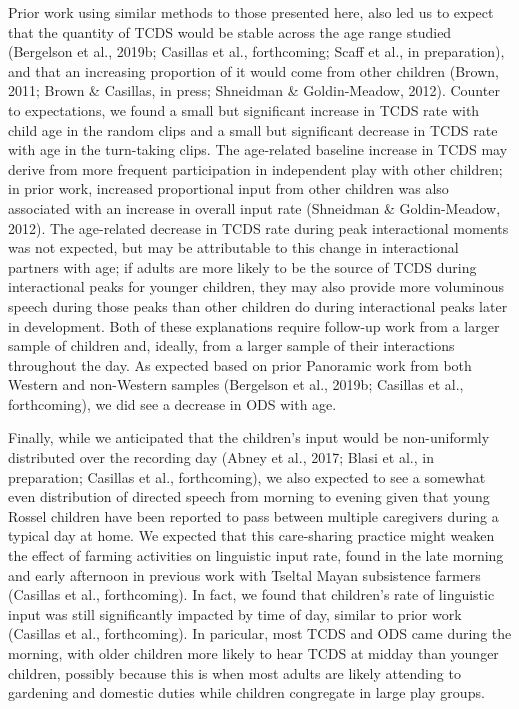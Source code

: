 \documentclass[,man,floatsintext]{apa6}
\begin{document}
Prior work using similar methods to those presented here, also led us to
expect that the quantity of TCDS would be stable across the age range
studied (Bergelson et al., 2019b; Casillas et al., forthcoming; Scaff et
al., in preparation), and that an increasing proportion of it would come
from other children (Brown, 2011; Brown \& Casillas, in press; Shneidman
\& Goldin-Meadow, 2012). Counter to expectations, we found a small but
significant increase in TCDS rate with child age in the random clips and
a small but significant decrease in TCDS rate with age in the
turn-taking clips. The age-related baseline increase in TCDS may derive
from more frequent participation in independent play with other
children; in prior work, increased proportional input from other
children was also associated with an increase in overall input rate
(Shneidman \& Goldin-Meadow, 2012). The age-related decrease in TCDS
rate during peak interactional moments was not expected, but may be
attributable to this change in interactional partners with age; if
adults are more likely to be the source of TCDS during interactional
peaks for younger children, they may also provide more voluminous speech
during those peaks than other children do during interactional peaks
later in development. Both of these explanations require follow-up work
from a larger sample of children and, ideally, from a larger sample of
their interactions throughout the day. As expected based on prior
Panoramic work from both Western and non-Western samples (Bergelson et
al., 2019b; Casillas et al., forthcoming), we did see a decrease in ODS
with age.

Finally, while we anticipated that the children's input would be
non-uniformly distributed over the recording day (Abney et al., 2017;
Blasi et al., in preparation; Casillas et al., forthcoming), we also
expected to see a somewhat even distribution of directed speech from
morning to evening given that young Rossel children have been reported
to pass between multiple caregivers during a typical day at home. We
expected that this care-sharing practice might weaken the effect of
farming activities on linguistic input rate, found in the late morning
and early afternoon in previous work with Tseltal Mayan subsistence
farmers (Casillas et al., forthcoming). In fact, we found that
children's rate of linguistic input was still significantly impacted by
time of day, similar to prior work (Casillas et al., forthcoming). In
paricular, most TCDS and ODS came during the morning, with older
children more likely to hear TCDS at midday than younger children,
possibly because this is when most adults are likely attending to
gardening and domestic duties while children congregate in large play
groups.
\end{document}
